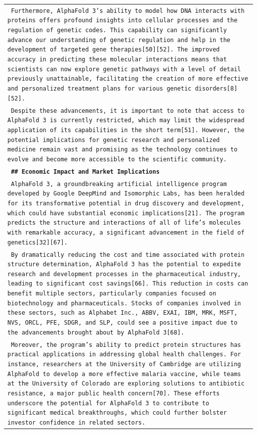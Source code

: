 \documentclass[11pt]{article}
\begin{document}
\begin{longtable}{p{\textwidth}}
\texttt{\small{ Furthermore, AlphaFold 3's ability to model how DNA interacts with proteins offers profound insights into cellular processes and the regulation of genetic codes. This capability can significantly advance our understanding of genetic regulation and help in the development of targeted gene therapies[50][52]. The improved accuracy in predicting these molecular interactions means that scientists can now explore genetic pathways with a level of detail previously unattainable, facilitating the creation of more effective and personalized treatment plans for various genetic disorders[8][52]. }} \\
\texttt{\small{ Despite these advancements, it is important to note that access to AlphaFold 3 is currently restricted, which may limit the widespread application of its capabilities in the short term[51]. However, the potential implications for genetic research and personalized medicine remain vast and promising as the technology continues to evolve and become more accessible to the scientific community. }} \\
\vspace{1pt}
\texttt{\small{\textbf{ \#\# Economic Impact and Market Implications }}} \\
\texttt{\small{ AlphaFold 3, a groundbreaking artificial intelligence program developed by Google DeepMind and Isomorphic Labs, has been heralded for its transformative potential in drug discovery and development, which could have substantial economic implications[21]. The program predicts the structure and interactions of all of life's molecules with remarkable accuracy, a significant advancement in the field of genetics[32][67]. }} \\
\texttt{\small{ By dramatically reducing the cost and time associated with protein structure determination, AlphaFold 3 has the potential to expedite research and development processes in the pharmaceutical industry, leading to significant cost savings[66]. This reduction in costs can benefit multiple sectors, particularly companies focused on biotechnology and pharmaceuticals. Stocks of companies involved in these sectors, such as Alphabet Inc., ABBV, EXAI, IBM, MRK, MSFT, NVS, ORCL, PFE, SDGR, and SLP, could see a positive impact due to the advancements brought about by AlphaFold 3[68]. }} \\
\texttt{\small{ Moreover, the program's ability to predict protein structures has practical applications in addressing global health challenges. For instance, researchers at the University of Cambridge are utilizing AlphaFold to develop a more effective malaria vaccine, while teams at the University of Colorado are exploring solutions to antibiotic resistance, a major public health concern[70]. These efforts underscore the potential for AlphaFold 3 to contribute to significant medical breakthroughs, which could further bolster investor confidence in related sectors. }} \\

\end{longtable}
\end{document}
